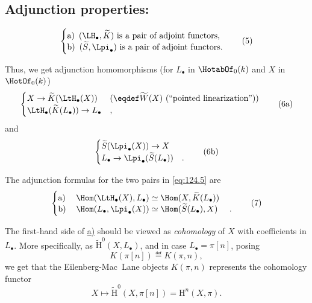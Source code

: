 \subsection[Adjunction properties]{Adjunction properties:}
\label{subsec:124.A}
\begin{equation}
  \label{eq:124.5}
  \left\{
    \begin{tabular}{@{}l@{}}
      a)\enspace $(\LH_\bullet,\widetilde K)$ is a pair of adjoint functors,
    \\
      b)\enspace $(\widetilde S, \Lpi_\bullet)$ is a pair of adjoint functors.
    \end{tabular}
  \right.\tag{5}
\end{equation}

Thus, we get adjunction homomorphisms (for $L_\bullet$ in
$\HotabOf_0(k)$ and $X$ in $\HotOf_0(k)$)
\begin{equation}
  \label{eq:124.6a}
  \begin{cases}
    X\to \widetilde K(\LtH_\bullet(X)) &
    \text{($\eqdef \widetilde W(X)$ (``pointed linearization''))} \\
    \LtH_\bullet(\widetilde K(L_\bullet)) \to L_\bullet &
    \text{,}
  \end{cases}\tag{6a}
\end{equation}
and
\begin{equation}
  \label{eq:124.6b}
  \begin{cases}
    \widetilde S(\Lpi_\bullet(X)) \to X & \text{} \\
    L_\bullet \to \Lpi_\bullet(\widetilde S(L_\bullet)) & \text{.}
  \end{cases}\tag{6b}
\end{equation}

The adjunction formulas for the two pairs in \eqref{eq:124.5} are
\begin{equation}
  \label{eq:124.7}
  \left\{
    \begin{tabular}{@{}lll@{}}
      a) & $\Hom(\LtH_\bullet(X),L_\bullet) \simeq \Hom(X,\widetilde
           K(L_\bullet))$ &\\
      b) & $\Hom(L_\bullet, \Lpi_\bullet(X)) \simeq \Hom(\widetilde
           S(L_\bullet), X)$ & .
    \end{tabular}
  \right.\tag{7}
\end{equation}

The first-hand side of \hyperref[eq:124.7]{a)} should be viewed as
\emph{cohomology} of $X$ with coefficients in $L_\bullet$. More
specifically, as $\widetilde{\mathrm H}^0(X,L_\bullet)$, and in case
$L_\bullet = \pi[n]$, posing
\begin{equation}
  \label{eq:124.8a}
  K(\pi[n]) \eqdef K(\pi,n),\tag{8a}
\end{equation}
we get that the Eilenberg-Mac~Lane objects $K(\pi,n)$ represents the
cohomology functor
\[ X\mapsto \widetilde{\mathrm H}^0(X,\pi[n]) = \mathrm
H^n(X,\pi).\]

